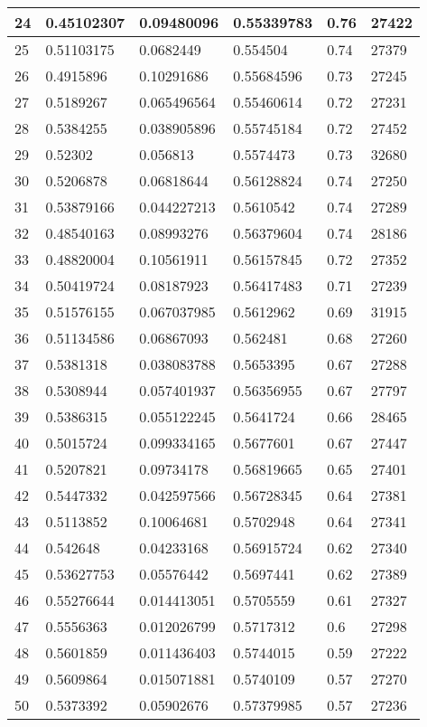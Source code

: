 \begin{longtable}{|l|l|l|l|l|l|}
24 & 0.45102307 & 0.09480096 & 0.55339783 & 0.76 & 27422 \\ \hline 
25 & 0.51103175 & 0.0682449 & 0.554504 & 0.74 & 27379 \\ \hline 
26 & 0.4915896 & 0.10291686 & 0.55684596 & 0.73 & 27245 \\ \hline 
27 & 0.5189267 & 0.065496564 & 0.55460614 & 0.72 & 27231 \\ \hline 
28 & 0.5384255 & 0.038905896 & 0.55745184 & 0.72 & 27452 \\ \hline 
29 & 0.52302 & 0.056813 & 0.5574473 & 0.73 & 32680 \\ \hline 
30 & 0.5206878 & 0.06818644 & 0.56128824 & 0.74 & 27250 \\ \hline 
31 & 0.53879166 & 0.044227213 & 0.5610542 & 0.74 & 27289 \\ \hline 
32 & 0.48540163 & 0.08993276 & 0.56379604 & 0.74 & 28186 \\ \hline 
33 & 0.48820004 & 0.10561911 & 0.56157845 & 0.72 & 27352 \\ \hline 
34 & 0.50419724 & 0.08187923 & 0.56417483 & 0.71 & 27239 \\ \hline 
35 & 0.51576155 & 0.067037985 & 0.5612962 & 0.69 & 31915 \\ \hline 
36 & 0.51134586 & 0.06867093 & 0.562481 & 0.68 & 27260 \\ \hline 
37 & 0.5381318 & 0.038083788 & 0.5653395 & 0.67 & 27288 \\ \hline 
38 & 0.5308944 & 0.057401937 & 0.56356955 & 0.67 & 27797 \\ \hline 
39 & 0.5386315 & 0.055122245 & 0.5641724 & 0.66 & 28465 \\ \hline 
40 & 0.5015724 & 0.099334165 & 0.5677601 & 0.67 & 27447 \\ \hline 
41 & 0.5207821 & 0.09734178 & 0.56819665 & 0.65 & 27401 \\ \hline 
42 & 0.5447332 & 0.042597566 & 0.56728345 & 0.64 & 27381 \\ \hline 
43 & 0.5113852 & 0.10064681 & 0.5702948 & 0.64 & 27341 \\ \hline 
44 & 0.542648 & 0.04233168 & 0.56915724 & 0.62 & 27340 \\ \hline 
45 & 0.53627753 & 0.05576442 & 0.5697441 & 0.62 & 27389 \\ \hline 
46 & 0.55276644 & 0.014413051 & 0.5705559 & 0.61 & 27327 \\ \hline 
47 & 0.5556363 & 0.012026799 & 0.5717312 & 0.6 & 27298 \\ \hline 
48 & 0.5601859 & 0.011436403 & 0.5744015 & 0.59 & 27222 \\ \hline 
49 & 0.5609864 & 0.015071881 & 0.5740109 & 0.57 & 27270 \\ \hline 
50 & 0.5373392 & 0.05902676 & 0.57379985 & 0.57 & 27236 \\ \hline 
\end{longtable}